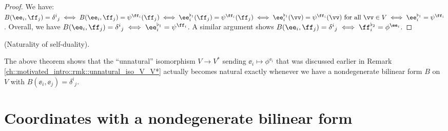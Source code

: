 \begin{proof}
    We have: $B(\ee_i, \ff_j) = \delta^i{}_j \iff B(\ee_i, \ff_j) = \psi^{\ff_i}(\ff_j) \iff \ee_i^{\flat_1}(\ff_j) = \psi^{\ff_i}(\ff_j) \iff \ee_i^{\flat_1}(\vv) = \psi^{\ff_i}(\vv) \text{ for all $\vv \in V$} \iff \ee_i^{\flat_1} = \psi^{\ff_i}$. Overall, we have $B(\ee_i, \ff_j) = \delta^i{}_j \iff \ee_i^{\flat_1} = \psi^{\ff_i}$. A similar argument shows $B(\ee_i, \ff_j) = \delta^i{}_j \iff \ff_i^{\flat_2} = \phi^{\ee_i}$.
\end{proof}

\begin{remark}
\label{ch::bilinear_forms_metric_tensors::thm::musical_iso_unique_self_dual_iso}
    (Naturality of self-duality).

    The above theorem shows that the ``unnatural'' isomorphism $V \rightarrow V^*$ sending $\ee_i \mapsto \phi^{\ee_i}$ that was discussed earlier in Remark \ref{ch::motivated_intro::rmk::unnatural_iso_V_V*} actually becomes natural exactly whenever we have a nondegenerate bilinear form $B$ on $V$ with $B(\ee_i, \ee_j) = \delta^i{}_j$.
\end{remark}

\newpage


\newpage

\section*{Coordinates with a nondegenerate bilinear form}

